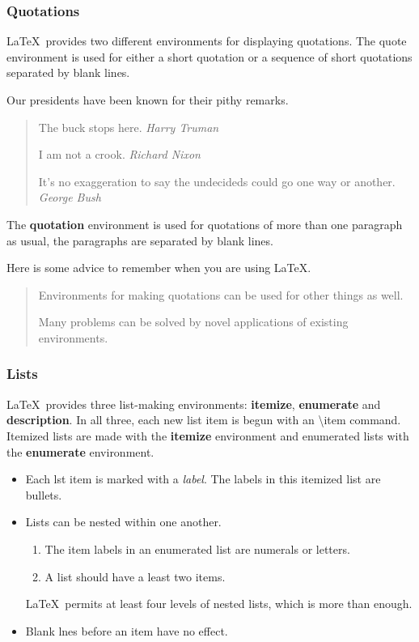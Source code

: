 \documentclass[twocolumn]{article}        %
\begin{document}
\subsubsection*{Quotations}

\LaTeX\ provides two different environments for displaying quotations. The quote environment is used for 
either a short quotation or a sequence of short quotations separated by blank lines.

Our presidents have been known for their pithy remarks.
\begin{quote}
The buck stops here. \emph{Harry Truman}

I am not a crook. \emph{Richard Nixon}

It's no exaggeration to say the undecideds could go one way or another. \emph{George Bush}
\end{quote}

The \textbf{quotation} environment is used for quotations of more than one paragraph as usual, 
the paragraphs are separated by blank lines.

Here is some advice to remember when you are using \LaTeX. 
\begin{quotation}
Environments for making quotations can be used for other things as well.

Many problems can be solved by novel applications of existing environments.
\end{quotation}

\subsubsection*{Lists}

\LaTeX\ provides three list-making environments: 
\textbf{itemize}, \textbf{enumerate} and \textbf{description}.
In all three, each new list item is begun with an \textbackslash item command. 
Itemized lists are made with the
\textbf{itemize} environment and enumerated lists with the \textbf{enumerate} environment.

\begin{itemize}
    \item Each lst item is marked with a \emph{label}. The labels in this itemized list are bullets.
    \item Lists can be nested within one another.
    \begin{enumerate}
        \item The item labels in an enumerated list are numerals or letters.
        \item A list should have a least two items.
    \end{enumerate}
    \LaTeX\ permits at least four levels of nested lists, which is more than enough.

    \item Blank lnes before an item have no effect.
\end{itemize}
\end{document}
